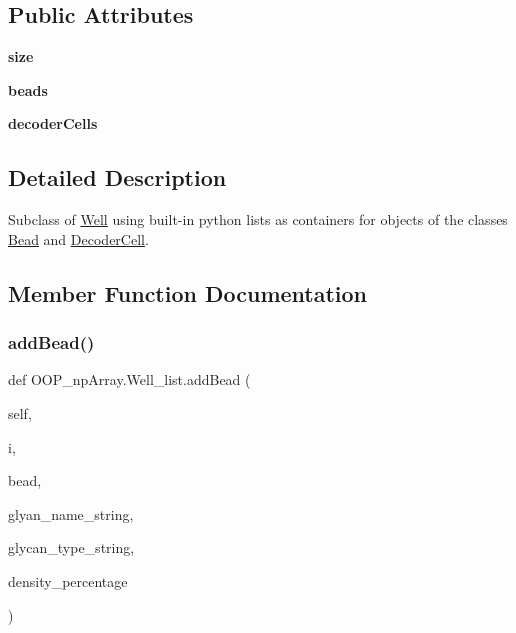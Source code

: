 \subsection*{Public Attributes}
\begin{DoxyCompactItemize}
\item 
\mbox{\label{class_o_o_p__np_array_1_1_well__list_a04f23430cc3154d47b51bfe2b12e8bfb}} 
{\bfseries size}
\item 
\mbox{\label{class_o_o_p__np_array_1_1_well__list_a5155967229f404a247799167c5c637a5}} 
{\bfseries beads}
\item 
\mbox{\label{class_o_o_p__np_array_1_1_well__list_ab5516771f8d44ae1c00b78abf101d5a6}} 
{\bfseries decoder\+Cells}
\end{DoxyCompactItemize}


\subsection{Detailed Description}
Subclass of \mbox{\hyperlink{class_o_o_p__np_array_1_1_well}{Well}} using built-\/in python lists as containers for objects of the classes \mbox{\hyperlink{class_o_o_p__np_array_1_1_bead}{Bead}} and \mbox{\hyperlink{class_o_o_p__np_array_1_1_decoder_cell}{Decoder\+Cell}}. 

\subsection{Member Function Documentation}
\mbox{\label{class_o_o_p__np_array_1_1_well__list_ae0961c99dd36f4417bc5c7f3cfe81b67}} 
\subsubsection{\texorpdfstring{add\+Bead()}{addBead()}}
{\footnotesize\ttfamily def O\+O\+P\+\_\+np\+Array.\+Well\+\_\+list.\+add\+Bead (\begin{DoxyParamCaption}\item[{}]{self,  }\item[{}]{i,  }\item[{}]{bead,  }\item[{}]{glyan\+\_\+name\+\_\+string,  }\item[{}]{glycan\+\_\+type\+\_\+string,  }\item[{}]{density\+\_\+percentage }\end{DoxyParamCaption})}



